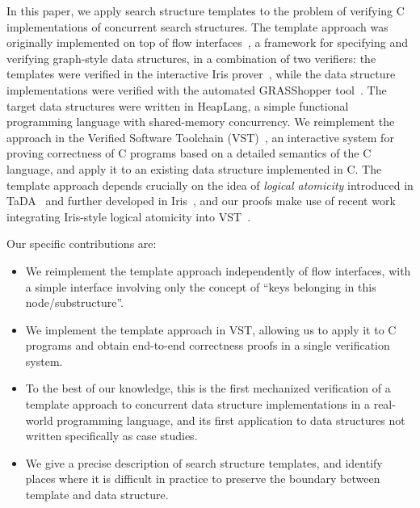 \documentclass[sigplan,10pt, screen]{acmart}
\begin{document}

In this paper, we apply search structure templates to the problem of verifying C implementations of concurrent search structures. The template approach was originally implemented on top of flow interfaces~\cite{krishna2017flow}, a framework for specifying and verifying graph-style data structures, in a combination of two verifiers: the templates were verified in the interactive Iris prover~\cite{iris}, while the data structure implementations were verified with the automated GRASShopper tool~\cite{grasshopper}. The target data structures were written in HeapLang, a simple functional programming language with shared-memory concurrency. We reimplement the approach in the Verified Software Toolchain (VST)~\cite{plcc}, an interactive system for proving correctness of C programs based on a detailed semantics of the C language, and apply it to an existing data structure implemented in C. The template approach depends crucially on the idea of \emph{logical atomicity} introduced in TaDA~\cite{tada} and further developed in Iris~\cite{iris}, and our proofs make use of recent work integrating Iris-style logical atomicity into VST~\cite{iris-vst-arxiv}. %

Our specific contributions are:
\begin{itemize}
	\item We reimplement the template approach independently of flow interfaces, with a simple interface involving only the concept of ``keys belonging in this node/substructure''.
	\item We implement the template approach in VST, allowing us to apply it to C programs and obtain end-to-end correctness proofs in a single verification system.
	\item To the best of our knowledge, this is the first mechanized verification of a template approach to concurrent data structure implementations in a real-world programming language, and its first application to data structures not written specifically as case studies.
	\item We give a precise description of search structure templates, and identify places where it is difficult in practice to preserve the boundary between template and data structure.
\end{itemize}
\end{document}
